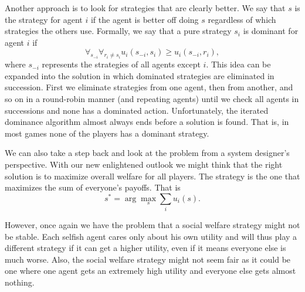 Another approach is to look for strategies that are clearly better. We
say that $s$ is the  strategy for agent $i$ if the agent
is better off doing $s$ regardless of which strategies the others use.
Formally, we say that a pure strategy $s_i$ is dominant for agent $i$ if
\begin{equation}
  \label{eq:dominant}
  \forall_{s_{-i}} \forall_{r_i \neq s_i} u_i(s_{-i}, s_{i})
  \geq u_i(s_{-i}, r_i),
\end{equation}
where $s_{-i}$ represents the strategies of all agents except $i$.
This idea can be expanded into the  solution in
which dominated strategies are eliminated in succession. First we
eliminate strategies from one agent, then from another, and so on in a
round-robin manner (and repeating agents) until we check all agents in
successions and none has a dominated action. Unfortunately, the
iterated dominance algorithm almost always ends before a solution is
found. That is, in most games none of the players has a dominant
strategy.

We can also take a step back and look at the problem from a system
designer's perspective. With our new enlightened outlook we might
think that the right solution is to maximize overall welfare for all
players. The  strategy is the one that maximizes
the sum of everyone's payoffs. That is
\begin{equation}
  \label{eq:social-welfare}
  s^* = \arg \max_s \sum_i u_i(s).
\end{equation}

However, once again we have the problem that a social welfare strategy
might not be stable. Each selfish agent cares only about his own
utility and will thus play a different strategy if it can get a higher
utility, even if it means everyone else is much worse. Also, the
social welfare strategy might not seem fair as it could be one where
one agent gets an extremely high utility and everyone else gets
almost nothing.

